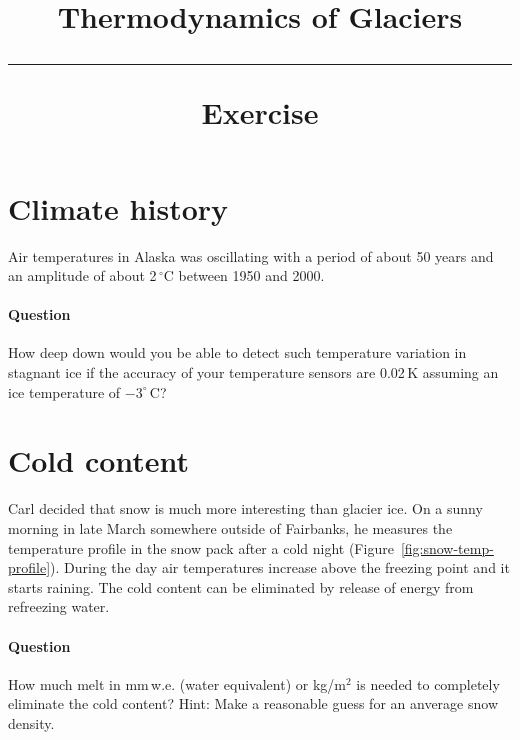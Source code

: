 \documentclass[parskip=half]{scrartcl}
\newcommand{\cels}[1]{\ensuremath{#1^{\circ}\,\mathrm{C}}}
\begin{document}
\vspace{-5em}

\title{Thermodynamics of Glaciers \\[.2em]
\rule[1em]{\textwidth}{2pt}
\LARGE\textsf{Exercise}
}
\date{}

\vspace{-5em}

\maketitle


\vspace{-5em}


\section{Climate history}

Air temperatures in Alaska was oscillating with a period of about 50 years and an amplitude of about 2$\,^\circ\text{C}$ between 1950 and 2000. 

\paragraph{Question} How deep down would you be able to detect such temperature variation in stagnant ice if the accuracy of your temperature sensors are 0.02$\,\mathrm{K}$ assuming an ice temperature of $-\cels{3}$?

\section{Cold content}

Carl decided that snow is much more interesting than glacier ice. On a sunny morning in late March somewhere outside of Fairbanks, he measures the temperature profile in the snow pack after a cold night (Figure~\ref{fig:snow-temp-profile}). During the day air temperatures increase above the freezing point and it starts raining. The cold content can be eliminated by release of energy from refreezing water. 

\paragraph{Question} How much melt in mm\,w.e. (water equivalent) or kg/m$^{2}$ is needed to completely eliminate the cold content? Hint: Make a reasonable guess for an anverage snow density.
\end{document}
